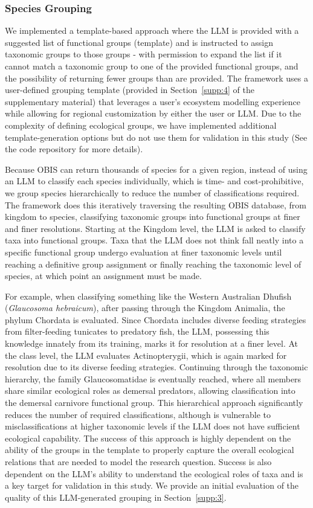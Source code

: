 \subsubsection{Species Grouping}

We implemented a template-based approach where the LLM is provided with a suggested list of functional groups (template) and is instructed to assign taxonomic groups to those groups - with permission to expand the list if it cannot match a taxonomic group to one of the provided functional groups, and the possibility of returning fewer groups than are provided. The framework uses a user-defined grouping template (provided in Section~\ref{supp:4} of the supplementary material) that leverages a user's ecosystem modelling experience while allowing for regional customization by either the user or LLM. Due to the complexity of defining ecological groups, we have implemented additional template-generation options but do not use them for validation in this study (See the code repository for more details).

Because OBIS can return thousands of species for a given region, instead of using an LLM to classify each species individually, which is time- and cost-prohibitive, we group species hierarchically to reduce the number of classifications required. The framework does this iteratively traversing the resulting OBIS database, from kingdom to species, classifying taxonomic groups into functional groups at finer and finer resolutions. Starting at the Kingdom level, the LLM is asked to classify taxa into functional groups. Taxa that the LLM does not think fall neatly into a specific functional group undergo evaluation at finer taxonomic levels until reaching a definitive group assignment or finally reaching the taxonomic level of species, at which point an assignment must be made. 

For example, when classifying something like the Western Australian Dhufish (\textit{Glaucosoma hebraicum}), after passing through the Kingdom Animalia, the phylum Chordata is evaluated. Since Chordata includes diverse feeding strategies from filter-feeding tunicates to predatory fish, the LLM, possessing this knowledge innately from its training, marks it for resolution at a finer level. At the class level, the LLM evaluates Actinopterygii, which is again marked for resolution due to its diverse feeding strategies. Continuing through the taxonomic hierarchy, the family Glaucosomatidae is eventually reached, where all members share similar ecological roles as demersal predators, allowing classification into the demersal carnivore functional group. This hierarchical approach significantly reduces the number of required classifications, although is vulnerable to misclassifications at higher taxonomic levels if the LLM does not have sufficient ecological capability. The success of this approach is highly dependent on the ability of the groups in the template to properly capture the overall ecological relations that are needed to model the research question. Success is also dependent on the LLM's ability to understand the ecological roles of taxa and is a key target for validation in this study. We provide an initial evaluation of the quality of this LLM-generated grouping in Section~\ref{supp:3}.


